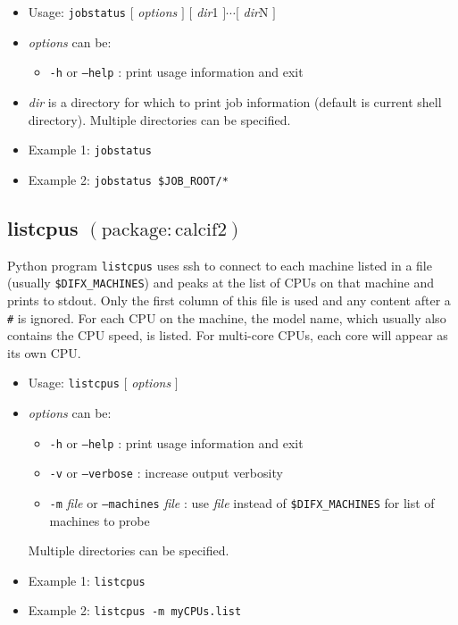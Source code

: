 \begin{itemize}
\item[] Usage: {\tt jobstatus} $[$ {\em options} $]$ $[$ {\em dir}1 $] \cdots [$ {\em dir}N $]$
\item[] {\em options} can be:
\begin{itemize}
\item[] {\tt -h} or {\tt --help} : print usage information and exit
\end{itemize}
\item[] {\em dir} is a directory for which to print job information (default is current shell directory).
Multiple directories can be specified.
\item[] Example 1: {\tt jobstatus}
\item[] Example 2: {\tt jobstatus \$JOB\_ROOT/*}
\end{itemize}










\subsection{listcpus {\small $\mathrm{(package: calcif2)}$}} \label{sec:listcpus}

Python program {\tt listcpus} uses ssh to connect to each machine listed in a file (usually {\tt \$DIFX\_MACHINES}) and peaks at the list of CPUs on that machine and prints to stdout.
Only the first column of this file is used and any content after a {\tt \#} is ignored.
For each CPU on the machine, the model name, which usually also contains the CPU speed, is listed.
For multi-core CPUs, each core will appear as its own CPU.

\begin{itemize}
\item[] Usage: {\tt listcpus} $[$ {\em options} $]$
\item[] {\em options} can be:
\begin{itemize}
\item[] {\tt -h} or {\tt --help} : print usage information and exit
\item[] {\tt -v} or {\tt --verbose} : increase output verbosity
\item[] {\tt -m} {\em file} or {\tt --machines} {\em file} : use {\em file} instead of {\tt \$DIFX\_MACHINES} for list of machines to probe
\end{itemize}
Multiple directories can be specified.
\item[] Example 1: {\tt listcpus}
\item[] Example 2: {\tt listcpus -m myCPUs.list}
\end{itemize}








